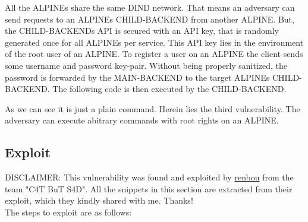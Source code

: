 \documentclass[10pt]{article}
\begin{document}
All the ALPINEs share the same DIND network. That means an adversary can send requests to an ALPINEs CHILD-BACKEND from another ALPINE. But, the CHILD-BACKENDs API is secured with an API key, that is randomly generated once for all ALPINEs per service. This API key lies in the environment of the root user of an ALPINE. To register a user on an ALPINE the client sends some username and password key-pair. Without being properly sanitized, the password is forwarded by the MAIN-BACKEND to the target ALPINEs CHILD-BACKEND. The following code is then executed by the CHILD-BACKEND.



As we can see it is just a plain  command. Herein lies the third vulnerability. The adversary can execute abitrary  commands with root rights on an ALPINE.

\subsection{Exploit}

DISCLAIMER: This vulnerability was found and exploited by \href{https://ctftime.org/user/65650}{renbou} from the team "C4T BuT S4D". All the snippets in this section are extracted from their exploit, which they kindly shared with me. Thanks! \\

The steps to exploit are as follows:
\end{document}
